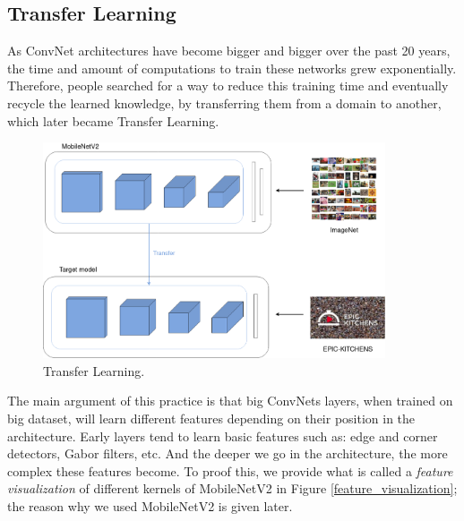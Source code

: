 \documentclass[12pt, a4paper]{report}
\begin{document}
			\subsection{Transfer Learning}
				As ConvNet architectures have become bigger and bigger over the past 20 years, the time and amount of computations to train these networks grew exponentially.
				Therefore, people searched for a way to reduce this training time and eventually recycle the learned knowledge, by transferring them from a domain to another, which later became Transfer Learning.
				\begin{figure}[h!]
					\centering
					\includegraphics[width=0.9\textwidth]{transfer_learning.png}
					\caption{Transfer Learning.}\label{transfer_learning}
				\end{figure}
				The main argument of this practice is that big ConvNets layers, when trained on big dataset, will learn different features depending on their position in the architecture.
				Early layers tend to learn basic features such as: edge and corner detectors, Gabor filters, etc.
				And the deeper we go in the architecture, the more complex these features become.
				To proof this, we provide what is called a {\itshape feature visualization} of different kernels of MobileNetV2 in Figure \ref{feature_visualization}; the reason why we used MobileNetV2 is given later.
\end{document}
